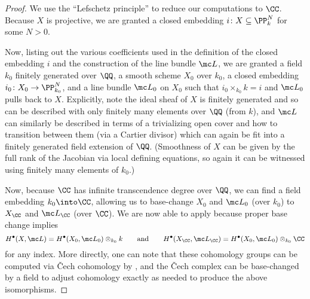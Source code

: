 \documentclass[../notes.tex]{subfiles}
\begin{document}
\begin{proof}
	We use the ``Lefschetz principle'' to reduce our computations to $\CC$. Because $X$ is projective, we are granted a closed embedding $i\colon X\subseteq\PP^N_k$ for some $N>0$.
	
	Now, listing out the various coefficients used in the definition of the closed embedding $i$ and the construction of the line bundle $\mc L$, we are granted a field $k_0$ finitely generated over $\QQ$, a smooth scheme $X_0$ over $k_0$, a closed embedding $i_0\colon X_0\to\PP^N_{k_0}$, and a line bundle $\mc L_0$ on $X_0$ such that $i_0\times_{k_0}k=i$ and $\mc L_0$ pulls back to $X$. Explicitly, note the ideal sheaf of $X$ is finitely generated and so can be described with only finitely many elements over $\QQ$ (from $k$), and $\mc L$ can similarly be described in terms of a trivializing open cover and how to transition between them (via a Cartier divisor) which can again be fit into a finitely generated field extension of $\QQ$. (Smoothness of $X$ can be given by the full rank of the Jacobian via local defining equations, so again it can be witnessed using finitely many elements of $k_0$.)

	Now, because $\CC$ has infinite transcendence degree over $\QQ$, we can find a field embedding $k_0\into\CC$, allowing us to base-change $X_0$ and $\mc L_0$ (over $k_0$) to $X_\CC$ and $\mc L_\CC$ (over $\CC$). We are now able to apply  because proper base change implies
	\[H^\bullet(X,\mc L)=H^\bullet(X_0,\mc L_0)\otimes_{k_0}k\qquad\text{and}\qquad H^\bullet(X_\CC,\mc L_\CC)=H^\bullet(X_0,\mc L_0)\otimes_{k_0}\CC\]
	for any index. More directly, one can note that these cohomology groups can be computed via \v Cech cohomology by , and the \v Cech complex can be base-changed by a field to adjust cohomology exactly as needed to produce the above isomorphisms.
\end{proof}
\end{document}
